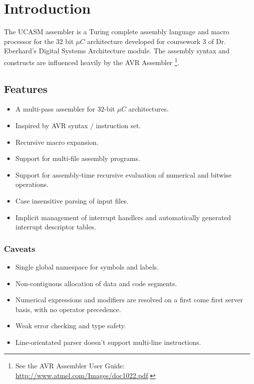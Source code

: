 \documentclass[12pt,twoside]{report}
\begin{document}



\tableofcontents

\newpage


\chapter{Introduction}

The UCASM assembler is a Turing complete assembly language and macro
processor for the 32 bit $\mu C$ architecture developed for coursework
3 of Dr. Eberhard's Digital Systems Architecture module. The assembly
syntax and constructs are influenced heavily by the AVR Assembler
\footnote{See the AVR Assembler User Guide:
  \url{http://www.atmel.com/Images/doc1022.pdf}.}.

\section{Features}

\begin{itemize}
\item A multi-pass assembler for 32-bit $\mu C$ architectures.
\item Inspired by AVR syntax / instruction set.
\item Recursive macro expansion.
\item Support for multi-file assembly programs.
\item Support for assembly-time recursive evaluation of numerical and
  bitwise operations.
\item Case insensitive parsing of input files.
\item Implicit management of interrupt handlers and automatically
  generated interrupt descriptor tables.
\end{itemize}

\subsection{Caveats}

\begin{itemize}
\item Single global namespace for symbols and labels.
\item Non-contiguous allocation of data and code segments.
\item Numerical expressions and modifiers are resolved on a first come
  first server basis, with no operator precedence.
\item Weak error checking and type safety.
\item Line-orientated parser doesn't support multi-line instructions.
\end{itemize}
\end{document}
